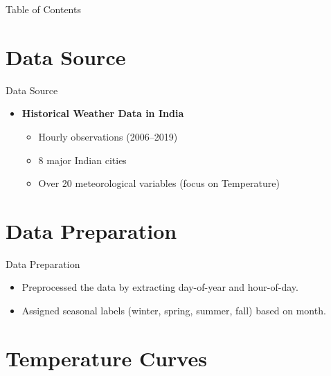\documentclass[svgnames, 12pt]{beamer}
\begin{document}
\begin{frame}{Table of Contents}
\tableofcontents
\end{frame}

\section{Data Source}

\begin{frame}{Data Source}
			\begin{itemize}
		\item \textbf{Historical Weather Data in India}
		\begin{itemize}
			\item Hourly observations (2006--2019)
			\item 8 major Indian cities
			\item Over 20 meteorological variables (focus on Temperature)
		\end{itemize}
			\end{itemize}
\end{frame}

\section{Data Preparation}

\begin{frame}{Data Preparation}
	\begin{itemize}
		\item Preprocessed the data by extracting day-of-year and hour-of-day.
		\item Assigned seasonal labels (winter, spring, summer, fall) based on month.
	\end{itemize}
\end{frame}

\section{Temperature Curves}
\end{document}

